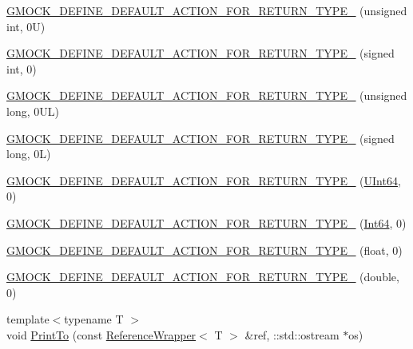 \begin{DoxyCompactItemize}
\item 
\mbox{\hyperlink{namespacetesting_1_1internal_a4285332d8eae4bdfffc13b6c05252c30}{G\+M\+O\+C\+K\+\_\+\+D\+E\+F\+I\+N\+E\+\_\+\+D\+E\+F\+A\+U\+L\+T\+\_\+\+A\+C\+T\+I\+O\+N\+\_\+\+F\+O\+R\+\_\+\+R\+E\+T\+U\+R\+N\+\_\+\+T\+Y\+P\+E\+\_\+}} (unsigned int, 0\+U)
\item 
\mbox{\hyperlink{namespacetesting_1_1internal_a200a33af38e17df617883567c4fd96ab}{G\+M\+O\+C\+K\+\_\+\+D\+E\+F\+I\+N\+E\+\_\+\+D\+E\+F\+A\+U\+L\+T\+\_\+\+A\+C\+T\+I\+O\+N\+\_\+\+F\+O\+R\+\_\+\+R\+E\+T\+U\+R\+N\+\_\+\+T\+Y\+P\+E\+\_\+}} (signed int, 0)
\item 
\mbox{\hyperlink{namespacetesting_1_1internal_a1f4167b954a7ff0074ce8a5bb855f86f}{G\+M\+O\+C\+K\+\_\+\+D\+E\+F\+I\+N\+E\+\_\+\+D\+E\+F\+A\+U\+L\+T\+\_\+\+A\+C\+T\+I\+O\+N\+\_\+\+F\+O\+R\+\_\+\+R\+E\+T\+U\+R\+N\+\_\+\+T\+Y\+P\+E\+\_\+}} (unsigned long, 0\+U\+L)
\item 
\mbox{\hyperlink{namespacetesting_1_1internal_ad8804e25537427755c324ab03a72e776}{G\+M\+O\+C\+K\+\_\+\+D\+E\+F\+I\+N\+E\+\_\+\+D\+E\+F\+A\+U\+L\+T\+\_\+\+A\+C\+T\+I\+O\+N\+\_\+\+F\+O\+R\+\_\+\+R\+E\+T\+U\+R\+N\+\_\+\+T\+Y\+P\+E\+\_\+}} (signed long, 0\+L)
\item 
\mbox{\hyperlink{namespacetesting_1_1internal_ad2efcdbd12c7c020745b87bcc0997809}{G\+M\+O\+C\+K\+\_\+\+D\+E\+F\+I\+N\+E\+\_\+\+D\+E\+F\+A\+U\+L\+T\+\_\+\+A\+C\+T\+I\+O\+N\+\_\+\+F\+O\+R\+\_\+\+R\+E\+T\+U\+R\+N\+\_\+\+T\+Y\+P\+E\+\_\+}} (\mbox{\hyperlink{namespacetesting_1_1internal_aa6a1ac454e6d7e550fa4925c62c35caa}{U\+Int64}}, 0)
\item 
\mbox{\hyperlink{namespacetesting_1_1internal_ab427739121a380a7934bda96153f053d}{G\+M\+O\+C\+K\+\_\+\+D\+E\+F\+I\+N\+E\+\_\+\+D\+E\+F\+A\+U\+L\+T\+\_\+\+A\+C\+T\+I\+O\+N\+\_\+\+F\+O\+R\+\_\+\+R\+E\+T\+U\+R\+N\+\_\+\+T\+Y\+P\+E\+\_\+}} (\mbox{\hyperlink{namespacetesting_1_1internal_a271c563fec38b804ddab0677f51f70a8}{Int64}}, 0)
\item 
\mbox{\hyperlink{namespacetesting_1_1internal_a71c697e5b567365fd3ff6c720769633b}{G\+M\+O\+C\+K\+\_\+\+D\+E\+F\+I\+N\+E\+\_\+\+D\+E\+F\+A\+U\+L\+T\+\_\+\+A\+C\+T\+I\+O\+N\+\_\+\+F\+O\+R\+\_\+\+R\+E\+T\+U\+R\+N\+\_\+\+T\+Y\+P\+E\+\_\+}} (float, 0)
\item 
\mbox{\hyperlink{namespacetesting_1_1internal_a7ba92aa33f4968c902623cd02e445020}{G\+M\+O\+C\+K\+\_\+\+D\+E\+F\+I\+N\+E\+\_\+\+D\+E\+F\+A\+U\+L\+T\+\_\+\+A\+C\+T\+I\+O\+N\+\_\+\+F\+O\+R\+\_\+\+R\+E\+T\+U\+R\+N\+\_\+\+T\+Y\+P\+E\+\_\+}} (double, 0)
\item 
{\footnotesize template$<$typename T $>$ }\\void \mbox{\hyperlink{namespacetesting_1_1internal_a8fd10cc30084c36a89c74868c8bd53f8}{Print\+To}} (const \mbox{\hyperlink{classtesting_1_1internal_1_1ReferenceWrapper}{Reference\+Wrapper}}$<$ T $>$ \&ref, \+::std\+::ostream $\ast$os)

\end{DoxyCompactItemize}
